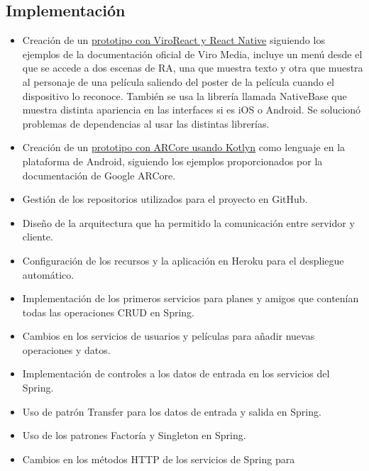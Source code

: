     \subsection{Implementación}
    \label{makereference7.2.3}
        \begin{itemize}
            \item Creación de un \href{https://github.com/DanielCalle/react-native-demo}{prototipo con ViroReact y React Native}
             siguiendo los ejemplos de la documentación oficial de Viro Media\cite{viroreact},
             incluye un menú desde el que se accede a dos escenas de RA, una
             que muestra texto y otra que muestra al personaje de una película
             saliendo del poster de la película cuando el
             dispositivo lo reconoce. También se usa la librería llamada NativeBase que
             muestra distinta apariencia en las interfaces si es iOS o Android.
             Se solucionó problemas de dependencias al usar las distintas librerías.
            \item Creación de un \href{https://github.com/DanielCalle/DemoARCore}{prototipo con ARCore usando Kotlyn} como lenguaje
            en la plataforma de Android, siguiendo los ejemplos proporcionados por
            la documentación de Google ARCore\cite{arcore}.
            \item Gestión de los repositorios utilizados para el proyecto en 
            GitHub.
            \item Diseño de la arquitectura que ha permitido la comunicación
             entre servidor y cliente.
            \item Configuración de los recursos y la aplicación en Heroku para
             el despliegue automático. 
            \item Implementación de los primeros servicios para planes y amigos
             que contenían todas las operaciones CRUD en Spring.
            \item Cambios en los servicios de usuarios y películas para añadir
             nuevas operaciones y datos.
            \item Implementación de controles a los datos de entrada en los servicios del Spring.
            \item Uso de patrón Transfer para los datos de entrada y salida en Spring.
            \item Uso de los patrones Factoría y Singleton en Spring.
            \item Cambios en los métodos HTTP de los servicios de Spring para

\end{itemize}
